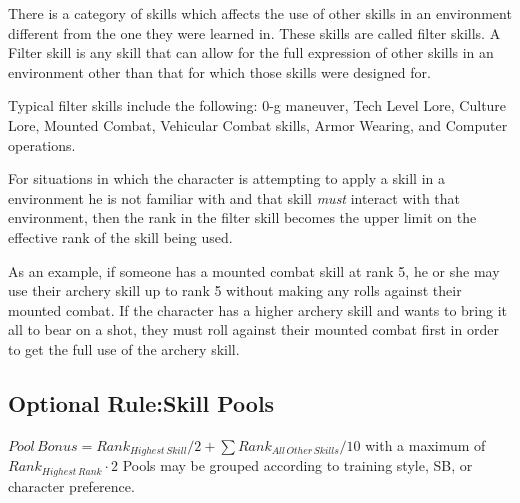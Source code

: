 There is a category of skills which affects the use of other skills 
in an environment different from the one they were learned in. These skills 
are called filter skills. A Filter skill is any skill that can allow
for the full expression of other skills in an environment other than 
that for which those skills were designed for.

Typical filter skills include the following: 0-g maneuver, Tech 
Level Lore, Culture Lore, Mounted Combat, Vehicular Combat 
skills, Armor Wearing, and Computer operations.

For situations in which the character is attempting to apply a skill 
in a environment he is not familiar with and that skill {\em must }
interact with that environment, then the rank in the filter skill 
becomes the upper limit on the effective rank of the skill being 
used.

As an example, if someone has a mounted combat skill at rank 5, he or she
may use their archery skill up to rank 5 without making any rolls
against their mounted combat. If the character has a higher archery skill
and wants to bring it all to bear on a shot, they must roll against
their mounted combat first in order to get the full use of the archery
skill.

\subsection{Optional Rule:Skill Pools}

$ {Pool\, Bonus} = Rank_{Highest\, Skill}/2 + \sum {Rank_{All\, Other\, Skills}}/10$ with a maximum
of $ Rank_{Highest\, Rank} \cdot 2$
Pools may be grouped according to training style, SB, or character
preference. 
